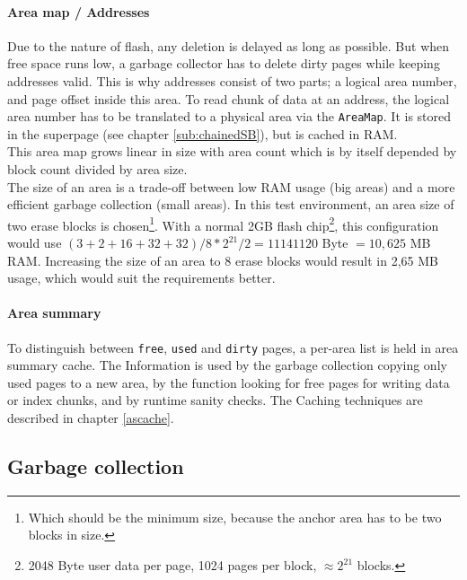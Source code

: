 \paragraph{Area map / Addresses}
Due to the nature of flash, any deletion is delayed as long as possible. But when free space runs low, a garbage collector has to delete dirty pages while keeping addresses valid. This is why addresses consist of two parts; a logical area number, and page offset inside this area. To read chunk of data at an address, the logical area number has to be translated to a physical area via the \texttt{AreaMap}. It is stored in the superpage (see chapter \ref{sub:chainedSB}), but is cached in RAM.\\
This area map grows linear in size with area count which is by itself depended by block count divided by area size.\\
The size of an area is a trade-off between low RAM usage (big areas) and a more efficient garbage collection (small areas). In this test environment, an area size of two erase blocks is chosen\footnote{Which should be the minimum size, because the anchor area has to be two blocks in size.}. With a normal 2GB flash chip\footnote{2048 Byte user data per page, 1024 pages per block, $\approx 2^21$ blocks.}, this configuration would use $(3+2+16+32+32) / 8 * 2^{21} / 2 = 11141120$ Byte $= 10,625$ MB RAM. Increasing the size of an area to 8 erase blocks would result in 2,65 MB usage, which would suit the requirements better.

\paragraph{Area summary}
To distinguish between \texttt{free}, \texttt{used} and \texttt{dirty} pages, a per-area list is held in area summary cache. The Information is used by the garbage collection copying only used pages to a new area, by the function looking for free pages for writing data or index chunks, and by runtime sanity checks. The Caching techniques are described in chapter \ref{ascache}.

\subsection{Garbage collection}
